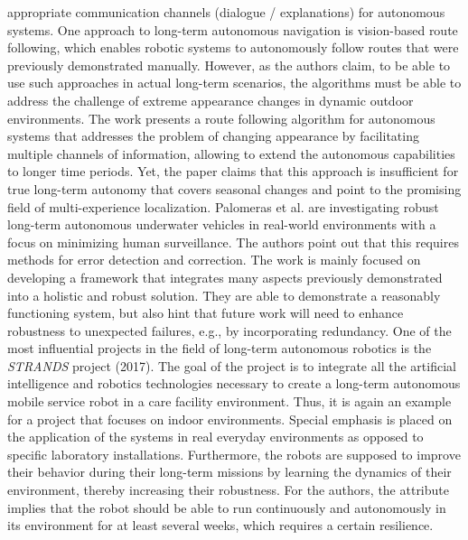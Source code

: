 \documentclass[english, master, utf8]{base/thesis_KBS}
\begin{document}
appropriate communication channels (dialogue / explanations) for autonomous systems.\newline
One approach to long-term autonomous navigation is vision-based route following, which enables robotic systems to autonomously follow routes that were previously demonstrated
manually. \cite{Paton:2016} However, as the authors claim, to be able to use such approaches in actual long-term scenarios, the algorithms must be able to address the challenge
of extreme appearance changes in dynamic outdoor environments. The work presents a route following algorithm for autonomous systems that addresses the problem of changing appearance
by facilitating multiple channels of information, allowing to extend the autonomous capabilities to longer time periods. Yet, the paper claims that this approach is insufficient for
true long-term autonomy that covers seasonal changes and point to the promising field of multi-experience localization.\newline
Palomeras et al. \cite{Palomeras:2016} are investigating robust long-term autonomous underwater vehicles in real-world environments with a focus on minimizing human surveillance.
The authors point out that this requires methods for error detection and correction. The work is mainly focused on developing a framework that integrates many aspects previously
demonstrated into a holistic and robust solution. They are able to demonstrate a reasonably functioning system, but also hint that future work will need to enhance robustness to
unexpected failures, e.g., by incorporating redundancy.\newline
One of the most influential projects in the field of long-term autonomous robotics is the \textit{STRANDS} \cite{Hawes:2017} project (2017). The goal of the project is to integrate all the
artificial intelligence and robotics technologies necessary to create a long-term autonomous mobile service robot in a care facility environment. Thus, it is again an example for a project
that focuses on indoor environments. Special emphasis is placed on the application of the systems in real everyday environments as opposed to specific laboratory installations.
Furthermore, the robots are supposed to improve their behavior during their long-term missions by learning the dynamics of their environment, thereby increasing their robustness.
For the authors, the attribute  implies that the robot should be able to run continuously and autonomously in its environment for at least several weeks, which requires
a certain resilience.
\end{document}
